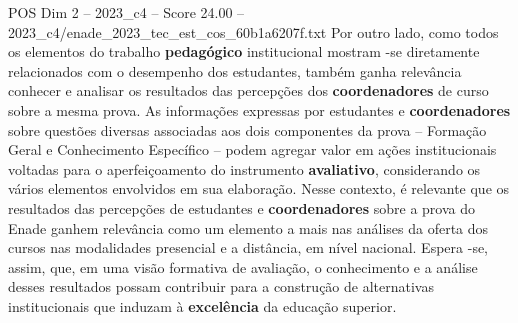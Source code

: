 \begin{textsample}{POS Dim 2 – 2023\_c4 – Score 24.00 – 2023\_c4/enade\_2023\_tec\_est\_cos\_60b1a6207f.txt}
Por outro lado, como todos os elementos do trabalho \textbf{pedagógico} institucional mostram -se diretamente relacionados com o desempenho dos estudantes, também ganha relevância conhecer e analisar os resultados das percepções dos \textbf{coordenadores} de curso sobre a mesma prova.
As informações expressas por estudantes e \textbf{coordenadores} sobre questões diversas associadas aos dois componentes da prova – Formação Geral e Conhecimento Específico – podem agregar valor em ações institucionais voltadas para o aperfeiçoamento do instrumento \textbf{avaliativo}, considerando os vários elementos envolvidos em sua elaboração.
Nesse contexto, é relevante que os resultados das percepções de estudantes e \textbf{coordenadores} sobre a prova do Enade ganhem relevância como um elemento a mais nas análises da oferta dos cursos nas modalidades presencial e a distância, em nível nacional.
Espera -se, assim, que, em uma visão formativa de avaliação, o conhecimento e a análise desses resultados possam contribuir para a construção de alternativas institucionais que induzam à \textbf{excelência} da educação superior.

\end{textsample}
